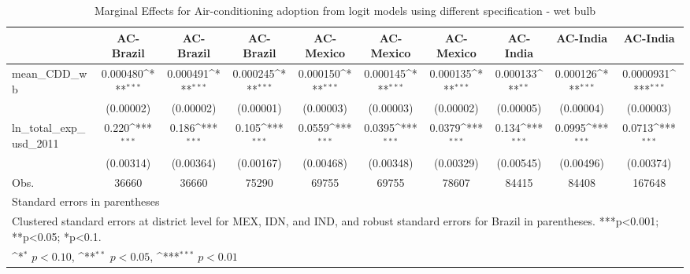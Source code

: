 \begin{table}[htbp]\centering
\def\sym#1{\ifmmode^{#1}\else\(^{#1}\)\fi}
\caption{Marginal Effects for Air-conditioning adoption from logit models using different specification - wet bulb}
\begin{tabular}{l*{9}{c}}
\hline\hline
            &\multicolumn{1}{c}{AC-Brazil}&\multicolumn{1}{c}{AC-Brazil}&\multicolumn{1}{c}{AC-Brazil}&\multicolumn{1}{c}{AC-Mexico}&\multicolumn{1}{c}{AC-Mexico}&\multicolumn{1}{c}{AC-Mexico}&\multicolumn{1}{c}{AC-India}&\multicolumn{1}{c}{AC-India}&\multicolumn{1}{c}{AC-India}\\
\hline
mean\_CDD\_wb &    0.000480\sym{***}&    0.000491\sym{***}&    0.000245\sym{***}&    0.000150\sym{***}&    0.000145\sym{***}&    0.000135\sym{***}&    0.000133\sym{**} &    0.000126\sym{***}&   0.0000931\sym{***}\\
            &   (0.00002)         &   (0.00002)         &   (0.00001)         &   (0.00003)         &   (0.00003)         &   (0.00002)         &   (0.00005)         &   (0.00004)         &   (0.00003)         \\
ln\_total\_exp\_usd\_2011&       0.220\sym{***}&       0.186\sym{***}&       0.105\sym{***}&      0.0559\sym{***}&      0.0395\sym{***}&      0.0379\sym{***}&       0.134\sym{***}&      0.0995\sym{***}&      0.0713\sym{***}\\
            &   (0.00314)         &   (0.00364)         &   (0.00167)         &   (0.00468)         &   (0.00348)         &   (0.00329)         &   (0.00545)         &   (0.00496)         &   (0.00374)         \\
\hline
Obs.        &       36660         &       36660         &       75290         &       69755         &       69755         &       78607         &       84415         &       84408         &      167648         \\
\hline\hline
\multicolumn{10}{l}{\footnotesize Standard errors in parentheses}\\
\multicolumn{10}{l}{\footnotesize Clustered standard errors at district level for MEX, IDN, and IND, and robust standard errors for Brazil in parentheses. ***p<0.001; **p<0.05; *p<0.1.}\\
\multicolumn{10}{l}{\footnotesize \sym{*} \(p<0.10\), \sym{**} \(p<0.05\), \sym{***} \(p<0.01\)}\\
\end{tabular}
\end{table}
